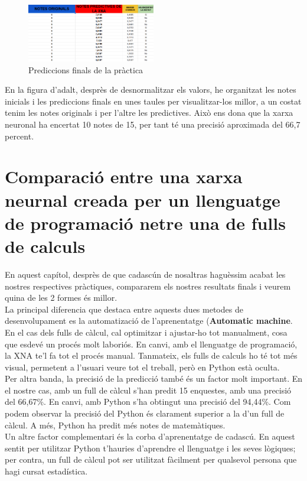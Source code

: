 \begin{figure}[H]
    \centering
    \includegraphics[width=0.5\textwidth]{./figures/Resultat_final.png}
    \caption{Prediccions finals de la pràctica}
\end{figure}

En la figura d'adalt, desprès de desnormalitzar els valors, he organitzat les notes inicials i les prediccions finals en unes taules per visualitzar-los millor, a un costat tenim les notes originals i per l'altre les predictives.
 Això ens dona que la xarxa neuronal ha encertat 10 notes de 15, per tant té una precisió aproximada del 66,7 percent.

\section{Comparació entre una xarxa neurnal creada per un llenguatge de programació netre una de fulls de calculs}
En aquest capítol, desprès de que cadascún de nosaltras haguèssim acabat les nostres respectives pràctiques, compararem els nostres resultats finals i veurem quina de les 2 formes és millor.\\

La principal diferencia que destaca entre aquests dues metodes de desenvolupament es la automatizació de l'aprenentatge (\textbf{Automatic machine}. En el cas dels fulls de càlcul, cal optimitzar i ajustar-ho tot manualment, cosa que esdevé un procés molt laboriós. En canvi, amb el llenguatge de programació, la XNA te'l fa tot el procés manual. Tanmateix, els fulls de calculs ho té tot més visual, permetent a l'usuari veure tot el treball, però en Python està oculta.\\

Per altra banda, la precisió de la predicció també és un factor molt important. En el nostre cas, amb un full de càlcul s’han predit 15 enquestes, amb una precisió del 66,67\%. En canvi, amb Python s’ha obtingut una precisió del 94,44\%. Com podem observar la precisió del Python és clarament superior a la d'un full de càlcul. A més, Python ha predit més notes de matemàtiques.\\

Un altre factor complementari és la corba d'aprenentatge de cadascú. En aquest sentit per utilitzar Python t'hauries d'aprendre el llenguatge i les seves lògiques; per contra, un full de càlcul pot ser utilitzat fàcilment per qualsevol persona que hagi cursat estadística.\\


